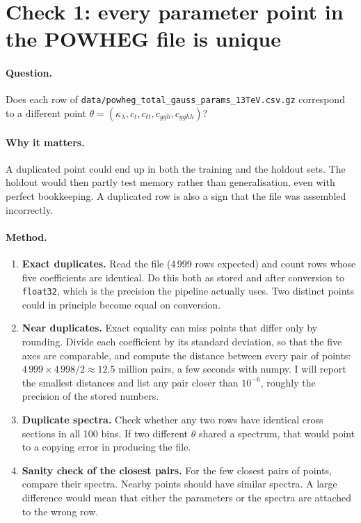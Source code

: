 \documentclass[11pt]{article}
\newcommand{\file}[1]{\nolinkurl{#1}}
\newcommand{\code}[1]{\texttt{#1}}
\begin{document}
\section{Check 1: every parameter point in the POWHEG file is unique}

\paragraph{Question.} Does each row of
\file{data/powheg_total_gauss_params_13TeV.csv.gz} correspond to a different point
$\theta = (\kappa_\lambda, c_t, c_{tt}, c_{ggh}, c_{gghh})$?

\paragraph{Why it matters.} A duplicated point could end up in both the training
and the holdout sets. The holdout would then partly test memory rather than
generalisation, even with perfect bookkeeping. A duplicated row is also a sign that
the file was assembled incorrectly.

\paragraph{Method.}
\begin{enumerate}[label=\textbf{1\alph*.}]
  \item \textbf{Exact duplicates.} Read the file (4\,999 rows expected) and count
  rows whose five coefficients are identical. Do this both as stored and after
  conversion to \code{float32}, which is the precision the pipeline actually uses.
  Two distinct points could in principle become equal on conversion.
  \item \textbf{Near duplicates.} Exact equality can miss points that differ only
  by rounding. Divide each coefficient by its standard deviation, so that the five
  axes are comparable, and compute the distance between every pair of points:
  $4\,999 \times 4\,998/2 \approx 12.5$ million pairs, a few seconds with numpy. I will report
  the smallest distances and list any pair closer than $10^{-6}$, roughly the
  precision of the stored numbers.
  \item \textbf{Duplicate spectra.} Check whether any two rows have identical
  cross sections in all 100 bins. If two different $\theta$ shared a spectrum, that
  would point to a copying error in producing the file.
  \item \textbf{Sanity check of the closest pairs.} For the few closest pairs of
  points, compare their spectra. Nearby points should have similar spectra. A large
  difference would mean that either the parameters or the spectra are attached to
  the wrong row.
\end{enumerate}
\end{document}
